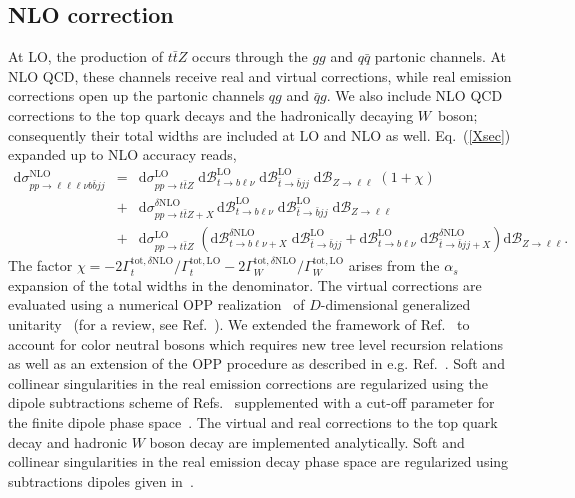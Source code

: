 \documentclass[preprint]{JHEP3}
\newcommand{\mrm}{\mathrm}
\newcommand{\rd}{\mathrm{d}}
\newcommand{\Br}{\mathcal{B}}
\def\ttbZ{t\bar{t}Z}
\newcommand{\be}{\begin{eqnarray}}
\newcommand{\ee}{\end{eqnarray}}
\begin{document}
\subsection{NLO correction}
At LO, the production of $\ttbZ$ occurs through the $gg$ and $q\bar{q}$ partonic channels. 
At NLO QCD, these channels receive real and virtual corrections, while real emission corrections open up the partonic channels $qg$ and $\bar{q}g$. 
We also include NLO QCD corrections to the top quark decays and the hadronically decaying $W$~boson; consequently their total widths are included at LO and NLO as well.
Eq.~(\ref{Xsec}) expanded up to NLO accuracy reads,
\be
 \rd \sigma_{pp\to\ell\ell\ell\nu b \bar{b} jj}^\mrm{NLO} &=& 
 \rd \sigma_{pp\to\ttbZ}^\mrm{LO} \; \rd\Br_{t\to b \ell\nu}^\mrm{LO} \; \rd\Br_{\bar{t} \to \bar{b} jj}^\mrm{LO} \; \rd\Br_{Z\to \ell\ell}
 \; \left( 1 + \chi \right)
\nonumber \\
 &+&   \rd \sigma_{pp\to\ttbZ+X}^{\delta \mrm{NLO}}  \, \rd\Br_{t\to b \ell\nu}^\mrm{LO} \; \rd\Br_{\bar{t} \to \bar{b} jj}^\mrm{LO} \; \rd\Br_{Z\to \ell\ell}
 \\
 &+&  \rd \sigma_{pp\to\ttbZ}^\mrm{LO} \; \left(  \rd\Br_{t\to b \ell\nu+X}^{\delta\mrm{NLO}} \; \rd\Br_{\bar{t} \to \bar{b} jj}^\mrm{LO} + \rd\Br_{t\to b \ell\nu}^\mrm{LO} \; 
\rd\Br_{\bar{t} \to \bar{b} jj+X}^{\delta\mrm{NLO}} \right) \rd\Br_{Z\to \ell\ell}
\nonumber. \label{XsecNLO}
\ee
The factor $\chi= -2 \Gamma_t^{\mrm{tot},\delta\mrm{NLO}}/\Gamma_t^{\mrm{tot,LO}} -2 \Gamma_W^{\mrm{tot},\delta\mrm{NLO}}/\Gamma_W^{\mrm{tot,LO}} $ arises from the $\alpha_s$ expansion
of the total widths in the denominator.
The virtual corrections are evaluated using a numerical OPP realization~\cite{Ossola:2006} of $D$-dimensional generalized unitarity~\cite{Ellis:2007br,Giele:2008ve,Ellis:2008ir} (for a review, see Ref.~\cite{Ellis:2011}).
We extended the framework of Ref.~\cite{Melnikov:2009dn} to account for color neutral bosons 
which requires new tree level recursion relations as well as an extension of the OPP procedure as described in e.g. Ref.~\cite{MAstro}.
Soft and collinear singularities in the real emission corrections are regularized using the dipole subtractions scheme of Refs.~\cite{Catani:1996vz,Catani:2002hc} supplemented with a cut-off parameter for the
finite dipole phase space~\cite{Nagy:2003tz,Nagy:2003tz,copy from ttbphoton paper}.
The virtual and real corrections to the top quark decay and hadronic $W$ boson decay are implemented analytically. 
Soft and collinear singularities in the real emission decay phase space are regularized using subtractions dipoles given in~\cite{see ttbphoton paper}.
\end{document}
